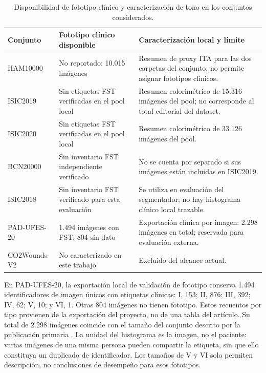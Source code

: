 \begin{table}[htbp]
\centering
\caption{Disponibilidad de fototipo clínico y caracterización de tono en los conjuntos considerados.}
\label{tab:disponibilidad-fototipo}
\begin{tabular}{p{2.3cm}p{4.3cm}p{7cm}}
\toprule
Conjunto & Fototipo clínico disponible & Caracterización local y límite \\
\midrule
HAM10000 & No reportado: 10.015 imágenes & Resumen de proxy ITA para las dos carpetas del conjunto; no permite asignar fototipos clínicos. \\
ISIC2019 & Sin etiquetas FST verificadas en el pool local & Resumen colorimétrico de 15.316 imágenes del pool; no corresponde al total editorial del dataset. \\
ISIC2020 & Sin etiquetas FST verificadas en el pool local & Resumen colorimétrico de 33.126 imágenes del pool. \\
BCN20000 & Sin inventario FST independiente verificado & No se cuenta por separado si sus imágenes están incluidas en ISIC2019. \\
ISIC2018 & Sin inventario FST verificado para esta evaluación & Se utiliza en evaluación del segmentador; no hay histograma clínico local trazable. \\
PAD-UFES-20 & 1.494 imágenes con FST; 804 sin dato & Exportación clínica por imagen: 2.298 imágenes en total; reservada para evaluación externa. \\
CO2Wounds-V2 & No caracterizado en este trabajo & Excluido del alcance actual. \\
\bottomrule
\end{tabular}
\end{table}

En PAD-UFES-20, la exportación local de validación de fototipo conserva 1.494 identificadores de imagen únicos con etiquetas clínicas: I, 153; II, 876; III, 392; IV, 62; V, 10; y VI, 1. Otras 804 imágenes no tienen fototipo. Estos recuentos por tipo provienen de la exportación del proyecto, no de una tabla del artículo. Su total de 2.298 imágenes coincide con el tamaño del conjunto descrito por la publicación primaria \parencite{pacheco2020padufes}. La unidad del histograma es la imagen, no el paciente: varias imágenes de una misma persona pueden compartir la etiqueta, sin que ello constituya un duplicado de identificador. Los tamaños de V y VI solo permiten descripción, no conclusiones de desempeño para esos fototipos.

